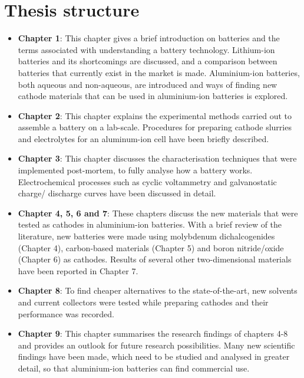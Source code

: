 \section*{\centering Thesis structure}
\begin{itemize}
    \item \textbf{Chapter 1}: This chapter gives a brief introduction on batteries and the terms associated with understanding a battery technology. Lithium-ion batteries and its shortcomings are discussed, and a comparison between batteries that currently exist in the market is made. Aluminium-ion batteries, both aqueous and non-aqueous, are introduced and ways of finding new cathode materials that can be used in aluminium-ion batteries is explored.
    \item \textbf{Chapter 2}: This chapter explains the experimental methods carried out to assemble a battery on a lab-scale. Procedures for preparing cathode slurries and electrolytes for an aluminum-ion cell have been briefly described.  
    \item \textbf{Chapter 3}: This chapter discusses the characterisation techniques that were implemented post-mortem, to fully analyse how a battery works. Electrochemical processes such as cyclic voltammetry and galvanostatic charge/ discharge curves have been discussed in detail.   
    \item \textbf{Chapter 4, 5, 6 and 7}: These chapters discuss the new materials that were tested as cathodes in aluminium-ion batteries. With a brief review of the literature, new batteries were made using molybdenum dichalcogenides (Chapter 4), carbon-based materials (Chapter 5) and boron nitride/oxide (Chapter 6) as cathodes. Results of several other two-dimensional materials have been reported in Chapter 7. 
    \item \textbf{Chapter 8}: To find cheaper alternatives to the state-of-the-art, new solvents and current collectors were tested while preparing cathodes and their performance was recorded.   
    \item \textbf{Chapter 9}: This chapter summarises the research findings of chapters 4-8 and provides an outlook for future research possibilities. Many new scientific findings have been made, which need to be studied and analysed in greater detail, so that aluminium-ion batteries can find commercial use.
    \end{itemize}

